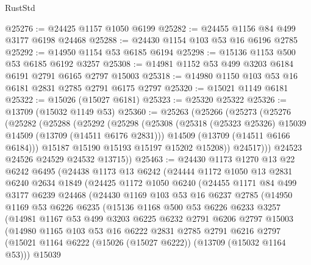 \begin{lexlean}{RustStd}
\begin{coremodule}
@25276 := @24425 @1157 @1050 @6199
@25282 := @24455 @1156 @84 @499 @3177 @6198 @24468
@25288 := @24430 @1154 @103 @53 @16 @6196 @2785
@25292 := @14950 @1154 @53 @6185 @6194
@25298 := @15136 @1153 @500 @53 @6185 @6192 @3257
@25308 := @14981 @1152 @53 @499 @3203 @6184 @6191 @2791 @6165 @2797 @15003
@25318 := @14980 @1150 @103 @53 @16 @6181 @2831 @2785 @2791 @6175 @2797
@25320 := @15021 @1149 @6181
@25322 := @15026 (@15027 @6181)
@25323 := @25320 @25322
@25326 := @13709 (@15032 @1149 @53)
@25360 := @25263
    (@25266
      (@25273
        (@25276
          (@25282
            (@25288
              (@25292
                (@25298
                  (@25308
                    (@25318 (@25323 @25326) @15039 @14509 (@13709 (@14511 @6176 @2831)))
                    @14509
                    (@13709 (@14511 @6166 @6184)))
                  @15187
                  @15190
                  @15193
                  @15197
                  @15202
                  @15208))
              @24517)))
        @24523
        @24526
        @24529
        @24532
        @13715))
@25463 := @24430
    @1173
    @1270
    @13
    @22
    @6242
    @6495
    (@24438
      @1173
      @13
      @6242
      (@24444
        @1172
        @1050
        @13
        @2831
        @6240
        @2634
        @1849
        (@24425
          @1172
          @1050
          @6240
          (@24455
            @1171
            @84
            @499
            @3177
            @6239
            @24468
            (@24430
              @1169
              @103
              @53
              @16
              @6237
              @2785
              (@14950
                @1169
                @53
                @6226
                @6235
                (@15136
                  @1168
                  @500
                  @53
                  @6226
                  @6233
                  @3257
                  (@14981
                    @1167
                    @53
                    @499
                    @3203
                    @6225
                    @6232
                    @2791
                    @6206
                    @2797
                    @15003
                    (@14980
                      @1165
                      @103
                      @53
                      @16
                      @6222
                      @2831
                      @2785
                      @2791
                      @6216
                      @2797
                      (@15021 @1164 @6222 (@15026 (@15027 @6222)) (@13709 (@15032 @1164 @53)))
                      @15039

\end{coremodule}
\end{lexlean}
